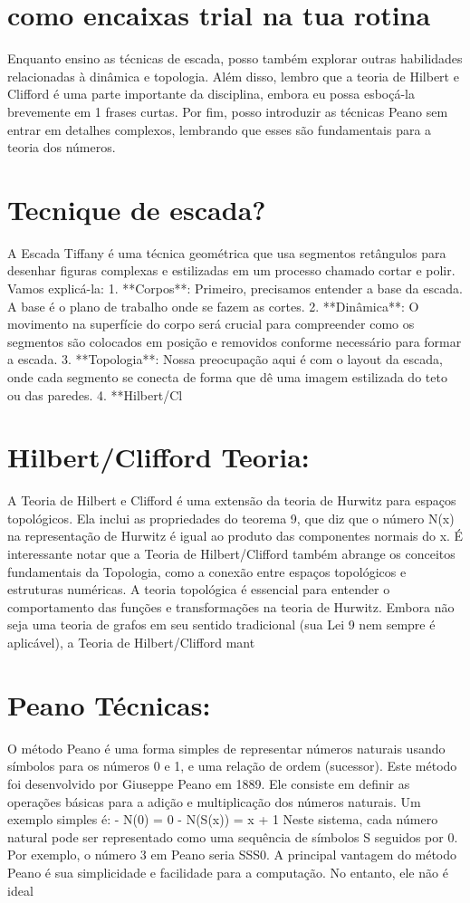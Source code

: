 \documentclass[11pt,a4paper]{article}
\begin{document}
\section{como encaixas trial na tua rotina}
Enquanto ensino as técnicas de escada, posso também explorar outras habilidades relacionadas à dinâmica e topologia. Além disso, lembro que a teoria de Hilbert e Clifford é uma parte importante da disciplina, embora eu possa esboçá-la brevemente em 1 frases curtas. Por fim, posso introduzir as técnicas Peano sem entrar em detalhes complexos, lembrando que esses são fundamentais para a teoria dos números.

\section{Tecnique de escada?}
A Escada Tiffany é uma técnica geométrica que usa segmentos retângulos para desenhar figuras complexas e estilizadas em um processo chamado cortar e polir. Vamos explicá-la: 1. **Corpos**: Primeiro, precisamos entender a base da escada. A base é o plano de trabalho onde se fazem as cortes. 2. **Dinâmica**: O movimento na superfície do corpo será crucial para compreender como os segmentos são colocados em posição e removidos conforme necessário para formar a escada. 3. **Topologia**: Nossa preocupação aqui é com o layout da escada, onde cada segmento se conecta de forma que dê uma imagem estilizada do teto ou das paredes. 4. **Hilbert/Cl

\section{Hilbert/Clifford Teoria:}
A Teoria de Hilbert e Clifford é uma extensão da teoria de Hurwitz para espaços topológicos. Ela inclui as propriedades do teorema 9, que diz que o número N(x) na representação de Hurwitz é igual ao produto das componentes normais do x. É interessante notar que a Teoria de Hilbert/Clifford também abrange os conceitos fundamentais da Topologia, como a conexão entre espaços topológicos e estruturas numéricas. A teoria topológica é essencial para entender o comportamento das funções e transformações na teoria de Hurwitz. Embora não seja uma teoria de grafos em seu sentido tradicional (sua Lei 9 nem sempre é aplicável), a Teoria de Hilbert/Clifford mant

\section{Peano Técnicas:}
O método Peano é uma forma simples de representar números naturais usando símbolos para os números 0 e 1, e uma relação de ordem (sucessor). Este método foi desenvolvido por Giuseppe Peano em 1889. Ele consiste em definir as operações básicas para a adição e multiplicação dos números naturais. Um exemplo simples é: - N(0) = 0 - N(S(x)) = x + 1 Neste sistema, cada número natural pode ser representado como uma sequência de símbolos S seguidos por 0. Por exemplo, o número 3 em Peano seria SSS0. A principal vantagem do método Peano é sua simplicidade e facilidade para a computação. No entanto, ele não é ideal
\end{document}
